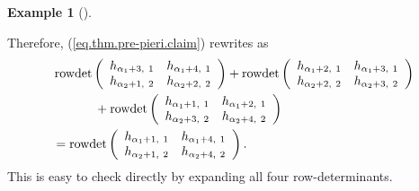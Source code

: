 \documentclass
[numbers=enddot,12pt,final,onecolumn,notitlepage,english]{scrartcl}%
\theoremstyle{definition}
\newtheorem{exam}[theo]{Example}
\newenvironment{example}[1][]
{\begin{exam}[#1]\begin{leftbar}}
{\end{leftbar}\end{exam}}
\begin{document}
\begin{example}
Therefore, (\ref{eq.thm.pre-pieri.claim}) rewrites as%
\begin{align*}
&  \operatorname*{rowdet}\left(
\begin{array}
[c]{cc}%
h_{\alpha_{1}+3,\ 1} & h_{\alpha_{1}+4,\ 1}\\
h_{\alpha_{2}+1,\ 2} & h_{\alpha_{2}+2,\ 2}%
\end{array}
\right)  +\operatorname*{rowdet}\left(
\begin{array}
[c]{cc}%
h_{\alpha_{1}+2,\ 1} & h_{\alpha_{1}+3,\ 1}\\
h_{\alpha_{2}+2,\ 2} & h_{\alpha_{2}+3,\ 2}%
\end{array}
\right) \\
&  \ \ \ \ \ \ \ \ \ \ +\operatorname*{rowdet}\left(
\begin{array}
[c]{cc}%
h_{\alpha_{1}+1,\ 1} & h_{\alpha_{1}+2,\ 1}\\
h_{\alpha_{2}+3,\ 2} & h_{\alpha_{2}+4,\ 2}%
\end{array}
\right) \\
&  =\operatorname*{rowdet}\left(
\begin{array}
[c]{cc}%
h_{\alpha_{1}+1,\ 1} & h_{\alpha_{1}+4,\ 1}\\
h_{\alpha_{2}+1,\ 2} & h_{\alpha_{2}+4,\ 2}%
\end{array}
\right)  .
\end{align*}
This is easy to check directly by expanding all four row-determinants.
\end{example}
\end{document}
